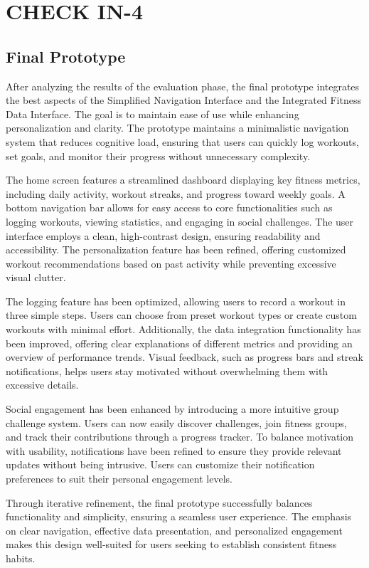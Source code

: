 \documentclass[
	letterpaper, %
]{jdf}
\begin{document}
\section{CHECK IN-4}
\subsection{Final Prototype}
After analyzing the results of the evaluation phase, the final prototype integrates the best aspects of the Simplified Navigation Interface and the Integrated Fitness Data Interface. The goal is to maintain ease of use while enhancing personalization and clarity. The prototype maintains a minimalistic navigation system that reduces cognitive load, ensuring that users can quickly log workouts, set goals, and monitor their progress without unnecessary complexity.

The home screen features a streamlined dashboard displaying key fitness metrics, including daily activity, workout streaks, and progress toward weekly goals. A bottom navigation bar allows for easy access to core functionalities such as logging workouts, viewing statistics, and engaging in social challenges. The user interface employs a clean, high-contrast design, ensuring readability and accessibility. The personalization feature has been refined, offering customized workout recommendations based on past activity while preventing excessive visual clutter.

The logging feature has been optimized, allowing users to record a workout in three simple steps. Users can choose from preset workout types or create custom workouts with minimal effort. Additionally, the data integration functionality has been improved, offering clear explanations of different metrics and providing an overview of performance trends. Visual feedback, such as progress bars and streak notifications, helps users stay motivated without overwhelming them with excessive details.

Social engagement has been enhanced by introducing a more intuitive group challenge system. Users can now easily discover challenges, join fitness groups, and track their contributions through a progress tracker. To balance motivation with usability, notifications have been refined to ensure they provide relevant updates without being intrusive. Users can customize their notification preferences to suit their personal engagement levels.

Through iterative refinement, the final prototype successfully balances functionality and simplicity, ensuring a seamless user experience. The emphasis on clear navigation, effective data presentation, and personalized engagement makes this design well-suited for users seeking to establish consistent fitness habits.
\end{document}
